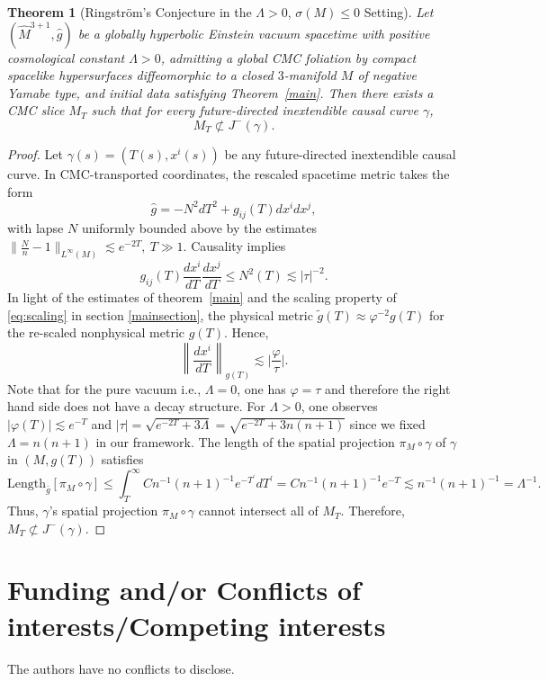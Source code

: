 \documentclass{amsart}
\newtheorem*{theorem-non}{Theorem}
\begin{document}
\begin{theorem-non}[Ringström's Conjecture in the $\Lambda > 0$, $\sigma(M) \leq 0$ Setting]
Let $(\widehat{M}^{3+1}, \widehat{g})$ be a globally hyperbolic Einstein vacuum spacetime with positive cosmological constant $\Lambda > 0$, admitting a global CMC foliation by compact spacelike hypersurfaces diffeomorphic to a closed $3$-manifold $M$ of negative Yamabe type, and initial data satisfying Theorem~\ref{main}. Then there exists a CMC slice $M_{T}$ such that for every future-directed inextendible causal curve $\gamma$,
\[
M_{T} \not\subset J^{-}(\gamma).
\]
\end{theorem-non}

\begin{proof}
Let $\gamma(s) = (T(s),x^i(s))$ be any future-directed inextendible causal curve. In CMC-transported coordinates, the rescaled spacetime metric takes the form
\[
\widehat{g} = -N^2 dT^2 + g_{ij}(T) dx^i dx^j,
\]
with lapse $N$ uniformly bounded above by the estimates $\|\frac{N}{n}-1\|_{L^{\infty}(M)}\lesssim e^{-2T},~T\gg 1$. Causality implies
\[
g_{ij}(T) \frac{dx^i}{dT} \frac{dx^j}{dT} \leq N^2(T) \lesssim |\tau|^{-2}.
\]
In light of the estimates of theorem~\ref{main} and the scaling property of \ref{eq:scaling} in section \ref{mainsection}, the physical metric $\widetilde{g}(T)\approx \varphi^{-2}g(T)$ for the re-scaled nonphysical metric $g(T)$. Hence,
\[
\left\| \frac{dx^i}{dT} \right\|_{g(T)} \lesssim \bigg|\frac{\varphi}{\tau}\bigg|.
\]
Note that for the pure vacuum i.e., $\Lambda=0$, one has $\varphi=\tau$ and therefore the right hand side does not have a decay structure. For $\Lambda>0$, one observes $|\varphi(T)|\lesssim e^{-T}$ and $|\tau|= \sqrt{e^{-2T}+3\Lambda}=\sqrt{e^{-2T}+3n(n+1)}$ since we fixed $\Lambda=n(n+1)$ in our framework. 
The length of the spatial projection $\pi_M \circ \gamma$ of $\gamma$ in $(M, g(T))$ satisfies
\[
\text{Length}_{\bar{g}}[\pi_M \circ \gamma] \leq \int_{T}^\infty Cn^{-1}(n+1)^{-1} e^{-T^{'}} dT^{'} = Cn^{-1}(n+1)^{-1} e^{-T}\lesssim n^{-1}(n+1)^{-1}=\Lambda^{-1}.
\]
Thus, $\gamma$'s spatial projection $\pi_M \circ \gamma$ cannot intersect all of $M_{T}$. Therefore, $M_{T} \not\subset J^{-}(\gamma)$.
\end{proof}



\section{Funding and/or Conflicts of interests/Competing interests}
\noindent The authors have no conflicts to disclose. 
\end{document}
